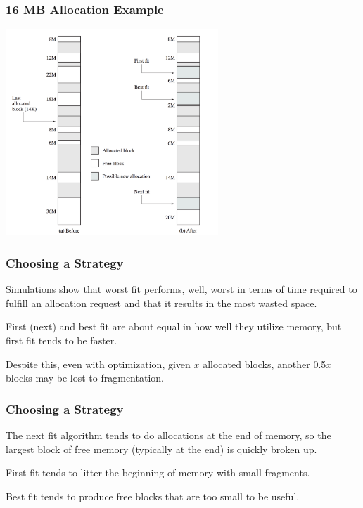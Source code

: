 \begin{frame}
\frametitle{16 MB Allocation Example}

\begin{center}
\includegraphics[width=0.60\textwidth]{images/first-best-next.png}
\end{center}


\end{frame}

\begin{frame}
\frametitle{Choosing a Strategy}

Simulations show that worst fit performs, well, worst in terms of time required to fulfill an allocation request and that it results in the most wasted space. 

First (next) and best fit are about equal in how well they utilize memory, but first fit tends to be faster. 

Despite this, even with optimization, given $x$ allocated blocks, another 0.5$x$ blocks may be lost to fragmentation.

\end{frame}



\begin{frame}
\frametitle{Choosing a Strategy}

The next fit algorithm tends to do allocations at the end of memory, so the largest block of free memory (typically at the end) is quickly broken up. 

First fit tends to litter the beginning of memory with small fragments.

Best fit tends to produce free blocks that are too small to be useful. 


\end{frame}



